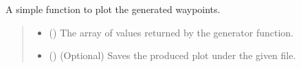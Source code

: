 \documentclass[letterpaper,10pt,english]{sphinxmanual}
\begin{document}
\begin{fulllineitems}
\label{\detokenize{modules/waypoints/generation:qnav.waypoints.generation.plot_waypoints}}
\pysigstartsignatures
{}
\pysigstopsignatures
\sphinxAtStartPar
A simple function to plot the generated waypoints.
\begin{quote}\begin{description}
\begin{itemize}
\item {} 
\sphinxAtStartPar
{} (\sphinxstyleliteralemphasis{\sphinxupquote{ (}}\sphinxstyleliteralemphasis{\sphinxupquote{)}}) \textendash{} The array of values returned by the generator
function.

\item {} 
\sphinxAtStartPar
{} () \textendash{} (Optional) Saves the produced plot under the given file.

\end{itemize}

\end{description}\end{quote}

\end{fulllineitems}

\end{document}
